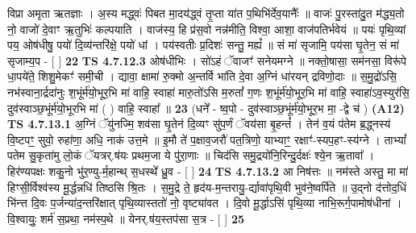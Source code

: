 \documentclass[17pt]{extarticle}
\begin{document}
                  विप्रा अमृता ऋतज्ञाः । अ॒स्य मद्ध्वः॑ पिबत मा॒दय॑द्ध्वं तृ॒प्ता या॑त प॒थिभि॑र्देव॒यानैः᳚ ॥ वाजः॑ पु॒रस्ता॑दु॒त म॑द्ध्य॒तो नो॒ वाजो॑ दे॒वाꣳ ऋ॒तुभिः॑ कल्पयाति । वाज॑स्य॒ हि प्र॑स॒वो नन्न॑मीति॒ विश्वा॒ आशा॒ वाज॑पतिर्भवेयं ॥ पयः॑ पृथि॒व्यां पय॒ ओष॑धीषु॒ पयो॑ दि॒व्य॑न्तरि॑क्षे॒ पयो॑ धां । पय॑स्वतीः प्र॒दिशः॑ सन्तु॒ मह्यं᳚ ॥ सं मा॑ सृजामि॒ पय॑सा घृ॒तेन॒ सं मा॑ सृजाम्य॒प - [  ] \textbf{  22} \newline
                  \newline
                                \textbf{ TS 4.7.12.3} \newline
                  ओष॑धीभिः । सो॑ऽहं ॅवाजꣳ॑ सनेयमग्ने ॥ नक्तो॒षासा॒ सम॑नसा॒ विरू॑पे धा॒पये॑ते॒ शिशु॒मेकꣳ॑ समी॒ची । द्यावा॒ क्षामा॑ रु॒क्मो अ॒न्तर्वि भा॑ति दे॒वा अ॒ग्निं धा॑रयन् द्रविणो॒दाः ॥ स॒मु॒द्रो॑ऽसि॒ नभ॑स्वाना॒र्द्रदा॑नुः श॒भूंर्म॑यो॒भूर॒भि मा॑ वाहि॒ स्वाहा॑ मारु॒तो॑ऽसि म॒रुतां᳚ ग॒णः श॒भूंर्म॑यो॒भूर॒भि मा॑ वाहि॒ स्वाहा॑ऽव॒स्युर॑सि॒ दुव॑स्वाञ्छ॒भूंर्म॑यो॒भूरभि मा॑ ( ) वाहि॒ स्वाहा᳚ ॥ \textbf{  23} \newline
                  \newline
                      (धने᳚ - ष्व॒पो - दुव॑स्वाञ्छ॒भूंर्म॑यो॒भूर॒भ मा॒ -द्वे च॑ )  \textbf{(A12)} \newline \newline
                                        \textbf{ TS 4.7.13.1} \newline
                  अ॒ग्निं ॅयु॑नज्मि॒ शव॑सा घृ॒तेन॑ दि॒व्यꣳ सु॑प॒र्णं ॅवय॑सा बृ॒हन्तं᳚ । तेन॑ व॒यं प॑तेम ब्र॒द्ध्नस्य॑ वि॒ष्टपꣳ॒॒ सुवो॒ रुहा॑णा॒ अधि॒ नाक॑ उत्त॒मे ॥ इ॒मौ ते॑ प॒क्षाव॒जरौ॑ पत॒त्रिणो॒ याभ्याꣳ॒॒ रक्षाꣳ॑-स्यप॒हꣳ-स्य॑ग्ने । ताभ्यां᳚ पतेम सु॒कृता॑मु लो॒कं ॅयत्रर्.ष॑यः प्रथम॒जा ये पु॑रा॒णाः ॥ चिद॑सि समु॒द्रयो॑नि॒रिन्दु॒र्दक्षः॑ श्ये॒न ऋ॒तावा᳚ । हिर॑ण्यपक्षः शकु॒नो भु॑र॒ण्यु-र्म॒हान्थ् स॒धस्थे᳚ ध्रु॒व - [  ] \textbf{  24} \newline
                  \newline
                                \textbf{ TS 4.7.13.2} \newline
                  आ निष॑त्तः ॥ नम॑स्ते अस्तु॒ मा मा॑ हिꣳसी॒र्विश्व॑स्य मू॒र्द्धन्नधि॑ तिष्ठसि श्रि॒तः । स॒मु॒द्रे ते॒ हृद॑य-म॒न्तरायु॒-र्द्यावा॑पृथि॒वी भुव॑ने॒ष्वर्पि॑ते ॥ उ॒द्नो द॑त्तोद॒धिं भि॑न्त्त दि॒वः प॒र्जन्या॑द॒न्तरि॑क्षात् पृथि॒व्यास्ततो॑ नो॒ वृष्ट्या॑वत । दि॒वो मू॒र्द्धाऽसि॑ पृथि॒व्या नाभि॒रूर्ग॒पामोष॑धीनां । वि॒श्वायुः॒ शर्म॑ स॒प्रथा॒ नम॑स्प॒थे ॥ येनर्.ष॑य॒स्तप॑सा स॒त्र - [  ] \textbf{  25} \newline
                  \newline
\end{document}
